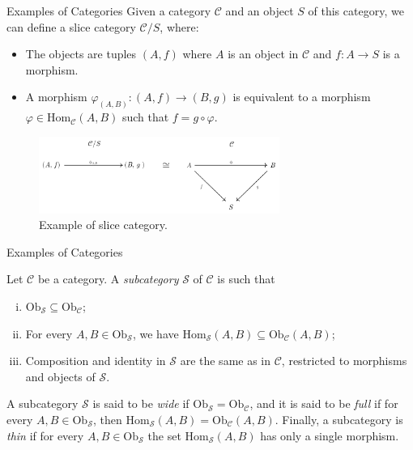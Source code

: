 \documentclass[aspectratio=169,xcolor=dvipsnames,10pt]{beamer}
\theoremstyle{definition}
\begin{document}
\begin{frame}[fragile]{Examples of Categories}
        Given a category \(\mathcal{C}\) and an object \(S\) of this category, we can define a slice category \(\mathcal{C} / S\), where:
        \begin{itemize}
            \item The objects are tuples \((A, f)\) where \(A\) is an object in \(\mathcal{C}\) and \(f: A \to S\) is a morphism.
            \item A morphism \(\varphi_{(A, B)} : (A, f) \to (B, g)\) is equivalent to a morphism \(\varphi \in \text{Hom}_{\mathcal{C}}(A, B)\) such that \(f = g \circ \varphi\).
        \end{itemize}
	\begin{figure}[H]
		\begin{center}
			\includegraphics[width=0.70\textwidth]{./figs/SliceCategory.pdf}
		\end{center}
		\caption{Example of slice category.}
		\label{fig:slice}
	\end{figure}
\end{frame}

\begin{frame}[fragile]{Examples of Categories}
    \begin{definition}[Subcategory]
        Let $\mathcal C$ be a category. A \textit{subcategory} $\mathcal S$ of $\mathcal C$ is such that
        \begin{enumerate}[(i)]
            \item $\text{Ob}_\mathcal S \subseteq \text{Ob}_\mathcal C$;
            \item For every $A,B \in \text{Ob}_\mathcal S$, we have $\text{Hom}_\mathcal S(A,B) \subseteq \text{Ob}_\mathcal C(A,B)$;
            \item Composition and identity in $\mathcal S$ are the same as in $\mathcal C$, restricted to morphisms and objects of $\mathcal S$.
        \end{enumerate}

        A subcategory $\mathcal S$ is said to be \textit{wide} if $\text{Ob}_\mathcal S = \text{Ob}_\mathcal C$,
        and it is said to be \textit{full} if for every $A,B \in \text{Ob}_\mathcal S$, then 
        $\text{Hom}_\mathcal S(A,B) = \text{Ob}_\mathcal C(A,B)$.
        Finally, a subcategory is \textit{thin} if
        for every $A,B \in \text{Ob}_\mathcal S$ the set $\text{Hom}_\mathcal S(A,B)$ has only a single morphism.
    \end{definition}
\end{frame}
\end{document}
